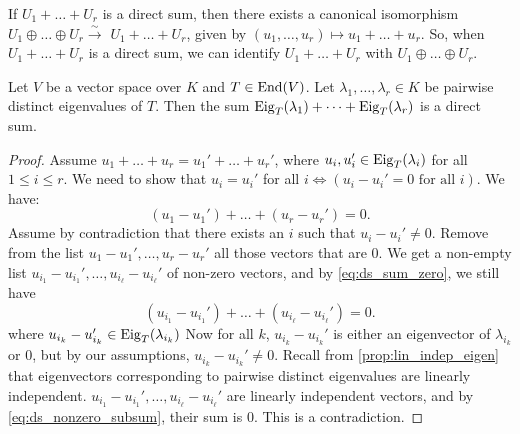 \begin{exercise}\label{ex:canonical_iso_direct_sum}
  If $U_1 + \dots + U_r$ is a direct sum, then there exists a canonical isomorphism $U_1 \oplus \dots \oplus U_r \xrightarrow{\sim} $ $U_1 + \dots + U_r$, given by $(u_1, \dots, u_r) \mapsto u_1 + \dots + u_r$. So, when $U_1 + \dots + U_r$ is a direct sum, we can identify $U_1 + \dots + U_r$ with $U_1 \oplus \dots \oplus U_r$.
\end{exercise}

\begin{proposition}\label{prop:direct_sum_eigenspaces}
  Let $V$ be a vector space over $K$ and $T \in \operatorname{End}(V)$. Let $\lambda_1, \dots, \lambda_r \in K$ be pairwise distinct eigenvalues of $T$. Then the sum $\operatorname{Eig}_T(\lambda_1) + \dots + \operatorname{Eig}_T(\lambda_r)$ is a direct sum.
\end{proposition}

\begin{proof}
  Assume $u_1 + \dots + u_r = u_1' + \dots + u_r'$, where $u_i, u_i' \in \operatorname{Eig}_T(\lambda_i)$ for all $1 \le i \le r$. We need to show that $u_i = u_i'$ for all $i \iff (u_i - u_i' = 0 \text{ for all } i)$.
  We have:
  \begin{equation} \label{eq:ds_sum_zero}
    (u_1 - u_1') + \dots + (u_r - u_r') = 0.
  \end{equation}
  Assume by contradiction that there exists an $i$ such that $u_i - u_i' \ne 0$.
  Remove from the list $u_1 - u_1', \dots, u_r - u_r'$ all those vectors that are 0. We get a non-empty list $u_{i_1} - u_{i_1}', \dots, u_{i_\ell} - u_{i_\ell}'$ of non-zero vectors, and by \eqref{eq:ds_sum_zero}, we still have
  \begin{equation} \label{eq:ds_nonzero_subsum}
    (u_{i_1} - u_{i_1}') + \dots + (u_{i_\ell} - u_{i_\ell}') = 0.
  \end{equation}
  where $u_{i_k} - u_{i_k}' \in \operatorname{Eig}_T(\lambda_{i_k})$
  Now for all $k$, $u_{i_k} - u_{i_k}'$ is either an eigenvector of $\lambda_{i_k}$ or 0, but by our assumptions, $u_{i_k} - u_{i_k}' \ne 0$.
  Recall from \cref{prop:lin_indep_eigen} that eigenvectors corresponding to pairwise distinct eigenvalues are linearly independent. $u_{i_1} - u_{i_1}', \dots, u_{i_\ell} - u_{i_\ell}'$ are linearly independent vectors, and by \eqref{eq:ds_nonzero_subsum}, their sum is $0$. This is a contradiction.
\end{proof}

